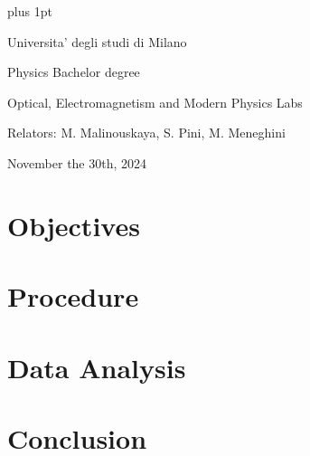 \documentclass[draft, a4paper,12pt]{article}
\begin{document}
\parskip=10pt plus 1pt
\parindent=0pt

\begin{center}
    Universita' degli studi di Milano

    Physics Bachelor degree

    \par{\Large{Optical, Electromagnetism and Modern Physics Labs}}

    Relators: M. Malinouskaya, S. Pini, M. Meneghini

    November the 30th, 2024
\end{center}



\section{Objectives}


\section{Procedure}


\section{Data Analysis}


\section{Conclusion}

\end{document}
